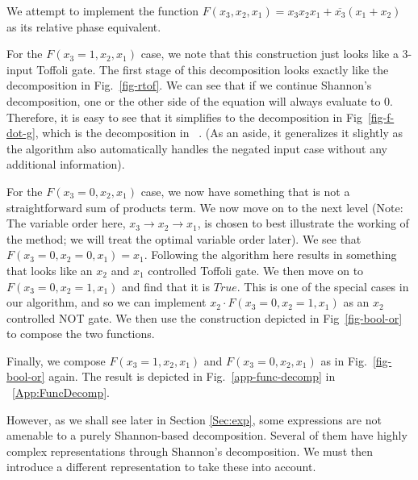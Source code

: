 \begin{example}
  \label{ex-bool}
  We attempt to implement the function $F(x_3,x_2,x_1) = x_3x_2x_1 + \overline{x_3}(x_1 + x_2)$ as its relative phase equivalent.

  For the $F(x_3 = 1,x_2,x_1)$ case, we note that this construction just looks like a 3-input Toffoli gate. The first stage of this decomposition looks exactly like the decomposition in Fig.~\ref{fig-rtof}. We can see that if we continue Shannon's decomposition, one or the other side of the equation will always evaluate to 0. Therefore, it is easy to see that it simplifies to the
  decomposition in Fig~\ref{fig-f-dot-g}, which is the decomposition in ~\cite{bib-amy-phase-state}.
  (As an aside, it generalizes it slightly as the algorithm also automatically handles the negated input
  case without any additional information). %
  
  For the $F(x_3 = 0,x_2,x_1)$ case, we now have something that is not a straightforward sum of products term.
  We now move on to the next level (Note: The variable order here, $x_3 \rightarrow x_2 \rightarrow x_1$, is chosen to best illustrate the working of the method; we will treat the optimal variable order later). We see that $F(x_3 = 0,x_2=0,x_1) = x_1$. Following the algorithm here results in something that looks like an $x_2$
  and $x_1$ controlled Toffoli gate. We then move on to $F(x_3 = 0,x_2=1,x_1)$ and find that it is $True$.
  This is one of the special cases in our algorithm, and so we can implement $x_2 \cdot F(x_3 = 0,x_2=1,x_1)$
  as an $x_2$ controlled NOT gate. We then use the construction depicted in Fig~\ref{fig-bool-or} to compose
  the two functions. %
  
  Finally, we compose $F(x_3 = 1,x_2,x_1)$ and $F(x_3 = 0,x_2,x_1)$ as in Fig.~\ref{fig-bool-or} again. The result is depicted in Fig.~\ref{app-func-decomp} in ~\ref{App:FuncDecomp}.
\end{example}

However, as we shall see later in Section \ref{Sec:exp}, some expressions are not amenable to a purely Shannon-based
decomposition. Several of them have highly complex representations through Shannon's decomposition.
We must then introduce a different representation to take these into account.

